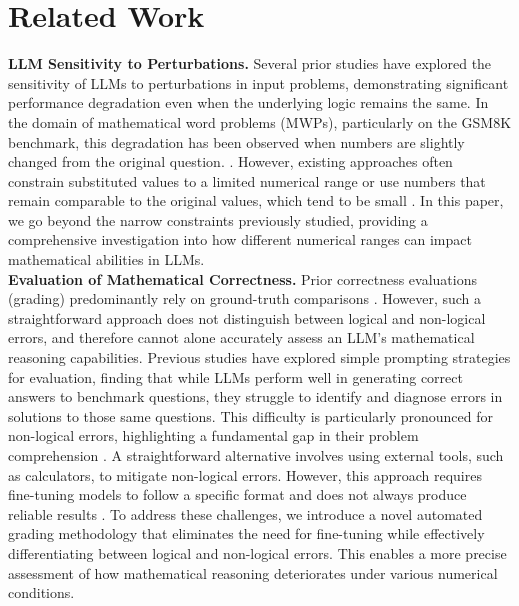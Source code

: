 \section{Related Work}
\textbf{LLM Sensitivity to Perturbations.}
Several prior studies \cite{stolfo2022causal,hooda2024large,jiang2024-peek,guo2024learning} have explored the sensitivity of LLMs to perturbations in input problems, demonstrating significant performance degradation even when the underlying logic remains the same. In the domain of mathematical word problems (MWPs), particularly on the GSM8K benchmark, this degradation has been observed when numbers are slightly changed from the original question. \cite{li2024-gsmplus,mirzadeh2024-gsmsymbolic,shi2023-GSMIC}. However, existing approaches often constrain substituted values to a limited numerical range \cite{stolfo2022causal} or use numbers that remain comparable to the original values, which tend to be small \cite{li2024-gsmplus,mirzadeh2024-gsmsymbolic,madaan2022-50percent}. In this paper, we go beyond the narrow constraints previously studied, providing a comprehensive investigation into how different numerical ranges can impact mathematical abilities in LLMs.\\

\noindent \textbf{Evaluation of Mathematical Correctness.} Prior correctness evaluations (grading) predominantly rely on ground-truth comparisons
\cite{shakarian2023eval,fu2023chain,hong2024caught,frieder2024mathematical}. 
However, such a straightforward approach does not distinguish between logical and non-logical errors, and therefore cannot alone accurately assess an LLM's mathematical reasoning capabilities. 
Previous studies have explored simple prompting strategies for evaluation, finding that while LLMs perform well in generating correct answers to benchmark questions, they struggle to identify and diagnose errors in solutions to those same questions. This difficulty is particularly pronounced for non-logical errors, highlighting a fundamental gap in their problem comprehension \cite{li2024evaluating, zeng2024mrgsm8kmetareasoningbenchmarklarge}. A straightforward alternative involves using external tools, such as calculators, to mitigate non-logical errors. However, this approach requires fine-tuning models to follow a specific format and does not always produce reliable results \cite{schick2023toolformer, cobbe2021-gsm8k}. To address these challenges, we introduce a novel automated grading methodology that eliminates the need for fine-tuning while effectively differentiating between logical and non-logical errors. This enables a more precise assessment of how mathematical reasoning deteriorates under various numerical conditions.

